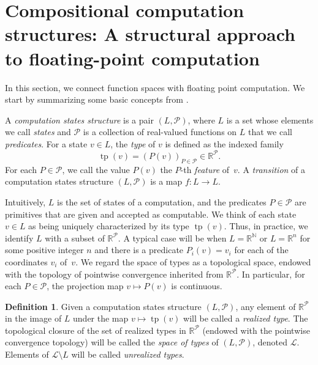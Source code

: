\documentclass[psamsfonts]{amsart}
\theoremstyle{definition}
\newtheorem{defn}[thm]{Definition}
\theoremstyle{remark}
\numberwithin{equation}{section}
\begin{document}
\section{Compositional computation structures: A structural approach \\ to floating-point computation}
\label{S:CCS}


In this section, we connect function spaces with floating point computation.
We start by summarizing some basic concepts from \cite{alva2024approximability}.

A \emph{computation states structure} is a pair $(L,\mathcal{P})$, where $L$ is a set whose elements we call \emph{states} and $\mathcal{P}$ is a collection of real-valued functions on $L$ that we call \emph{predicates}.
For a state $v\in L$, the  \emph{type} of $v$ is defined as  the indexed family
\[
\operatorname{tp}(v)= (P(v))_{P\in \mathcal{P}}\in\mathbb{R}^\mathcal{P}.
\]
For each $P\in \mathcal{P}$, we call the value $P(v)$ the $P$-th \emph{feature} of~$v$.
A \emph{transition} of a computation states structure  $(L,\mathcal{P})$ is a map $f:L\to L$.


Intuitively, $L$ is the set of states of a computation,  and the predicates  $P \in\mathcal{P}$ are primitives that are given and accepted as computable.
We think of  each state $v\in L$ as being uniquely characterized by its type $\operatorname{tp}(v)$.
Thus,  in practice, we identify $L$ with a subset of $\mathbb{R}^\mathcal{P}$.
A typical case will be when $L=\mathbb{R}^\mathbb{N}$ or $L=\mathbb{R}^n$ for some positive integer $n$ and there is a predicate $P_i(v) = v_i$ for each of the coordinates $v_i$ of~$v$.
We regard the space of types as a topological space, endowed with the topology of pointwise convergence inherited from $\mathbb{R}^\mathcal{P}$.
In particular, for each $P\in \mathcal{P}$, the projection map $v\mapsto P(v)$ is continuous.


\begin{defn}
Given a computation states structure $(L,\mathcal{P})$, any element of $\mathbb{R}^\mathcal{P}$  in the image of $L$ under the map $v\mapsto \operatorname{tp}(v)$ will be called a \emph{realized type}.
The topological closure of the set of realized types in $\mathbb{R}^\mathcal{P}$ (endowed with the pointwise convergence topology) will be called the \emph{space of types} of  $(L,\mathcal{P})$, denoted $\mathcal{L}$.
Elements of $\mathcal{L}\setminus L$ will be called \emph{unrealized types}.
\end{defn}
\end{document}
